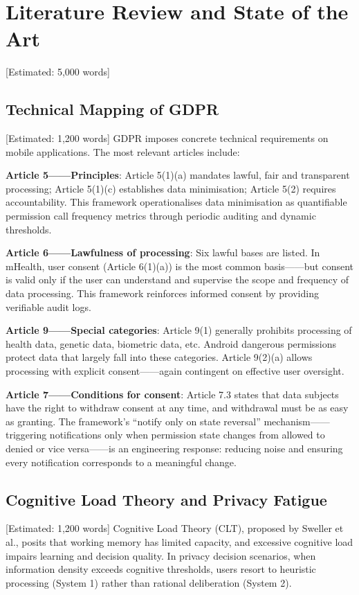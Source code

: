 \newpage\section{Literature Review and State of the Art} [Estimated: 5,000 words]

\subsection{Technical Mapping of GDPR} [Estimated: 1,200 words]
GDPR imposes concrete technical requirements on mobile applications. The most relevant articles include:

\textbf{Article 5——Principles}: Article 5(1)(a) mandates lawful, fair and transparent processing; Article 5(1)(c) establishes data minimisation; Article 5(2) requires accountability. This framework operationalises data minimisation as quantifiable permission call frequency metrics through periodic auditing and dynamic thresholds.

\textbf{Article 6——Lawfulness of processing}: Six lawful bases are listed. In mHealth, user consent (Article 6(1)(a)) is the most common basis——but consent is valid only if the user can understand and supervise the scope and frequency of data processing. This framework reinforces informed consent by providing verifiable audit logs.

\textbf{Article 9——Special categories}: Article 9(1) generally prohibits processing of health data, genetic data, biometric data, etc. Android dangerous permissions protect data that largely fall into these categories. Article 9(2)(a) allows processing with explicit consent——again contingent on effective user oversight.

\textbf{Article 7——Conditions for consent}: Article 7.3 states that data subjects have the right to withdraw consent at any time, and withdrawal must be as easy as granting. The framework's ``notify only on state reversal'' mechanism——triggering notifications only when permission state changes from allowed to denied or vice versa——is an engineering response: reducing noise and ensuring every notification corresponds to a meaningful change.

\subsection{Cognitive Load Theory and Privacy Fatigue} [Estimated: 1,200 words]
Cognitive Load Theory (CLT), proposed by Sweller et al., posits that working memory has limited capacity, and excessive cognitive load impairs learning and decision quality. In privacy decision scenarios, when information density exceeds cognitive thresholds, users resort to heuristic processing (System 1) rather than rational deliberation (System 2).

